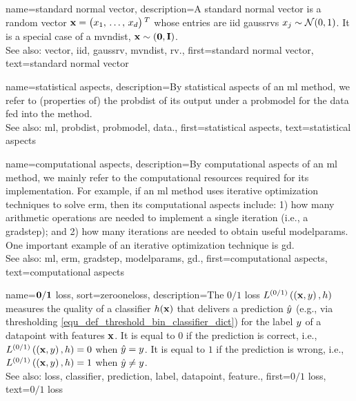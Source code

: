{name={standard normal vector}, 
	description={A standard normal \gls{vector} is a random 
		\gls{vector} ${\bf x}=\big(x_{1}, \,\ldots, \,x_{d}\big)\,^{T}$ 
		whose entries are \gls{iid} \glspl{gaussrv} $x_{j} \sim \mathcal{N}(0,1)$. 
		It is a special case of a \gls{mvndist}, ${\bf x} \sim \mathcal(\mathbf{0},\mathbf{I})$.
		\\ 
		See also: \gls{vector}, \gls{iid}, \gls{gaussrv}, \gls{mvndist}, \gls{rv}.}, 
	first={standard normal vector},
	text={standard normal vector}
}

{name={statistical aspects}, 
	description={By statistical aspects 
		of an \gls{ml} method, we refer to (properties of) the \gls{probdist} of its output 
		under a \gls{probmodel} for the \gls{data} fed into the method.
					\\ 
		See also: \gls{ml}, \gls{probdist}, \gls{probmodel}, \gls{data}.},
	first={statistical aspects},
	text={statistical aspects}
}

{name={computational aspects}, 
	description={By computational 
		aspects of an \gls{ml} method, we mainly refer to the computational 
		resources required for its implementation. For example, if an \gls{ml} method uses iterative 
		optimization techniques to solve \gls{erm}, then its computational aspects include: 1) how 
		many arithmetic operations are needed to implement a single iteration (i.e., a \gls{gradstep}); 
		and 2) how many iterations are needed to obtain useful \gls{modelparams}. One important 
		example of an iterative optimization technique is \gls{gd}.
					\\ 
		See also: \gls{ml}, \gls{erm}, \gls{gradstep}, \gls{modelparams}, \gls{gd}.}, 
	first={computational aspects},
	text={computational aspects}
}

{name={$\bf 0/1$ loss},
sort={zerooneloss}, 
	description={The $0/1$ \gls{loss} $L^{(0/1)}\left(\left( {\bf x},y \right),h \right)$ 
		measures the quality of a \gls{classifier} $h({\bf x})$ that delivers a 
		\gls{prediction} $\hat{y}$ (e.g., via thresholding \eqref{equ_def_threshold_bin_classifier_dict}) 
		for the \gls{label} $y$ of a \gls{datapoint} with \glspl{feature} ${\bf x}$. It is equal to $0$ if 
		the \gls{prediction} is correct, i.e., 
		$L^{(0/1)}\left(\left( {\bf x},y \right),h \right)=0$ when $\hat{y}=y$. It is 
		equal to $1$ if the \gls{prediction} is wrong, i.e., $L^{(0/1)}\left(\left( {\bf x},y \right),h \right)=1$ 
		when $\hat{y}\neq y$.
				\\ 
		See also: \gls{loss}, \gls{classifier}, \gls{prediction}, \gls{label}, \gls{datapoint}, \gls{feature}.},
    	first={$0/1$ loss},
	text={$0/1$ loss}
}

